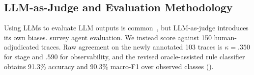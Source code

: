 \subsection{LLM-as-Judge and Evaluation Methodology}
Using LLMs to evaluate LLM outputs is common~\citep{li2025from,gao2025llmbased}, but LLM-as-judge introduces its own biases. \citet{mohammadi2025evaluation} survey agent evaluation. We instead score against 150 human-adjudicated traces. Raw agreement on the newly annotated 103 traces is $\kappa=.350$ for stage and $.590$ for observability, and the revised oracle-assisted rule classifier obtains 91.3\% accuracy and 90.3\% macro-F1 over observed classes ().
